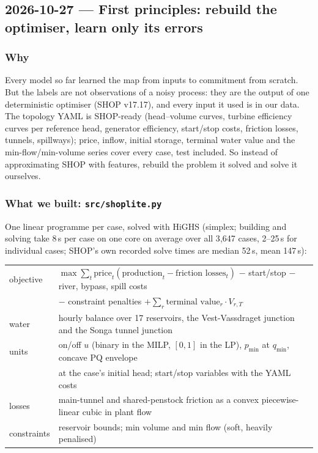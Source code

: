 \subsection{2026-10-27 --- First principles: rebuild the optimiser, learn only its errors}
\label{sec:shoplite}

\subsubsection*{Why}

Every model so far learned the map from inputs to commitment from scratch. But the labels are not
observations of a noisy process: they are the output of one deterministic optimiser (SHOP v17.17),
and every input it used is in our data. The topology YAML is SHOP-ready (head--volume curves,
turbine efficiency curves per reference head, generator efficiency, start/stop costs, friction
losses, tunnels, spillways); price, inflow, initial storage, terminal water value and the
min-flow/min-volume series cover every case, test included. So instead of approximating SHOP with
features, rebuild the problem it solved and solve it ourselves.

\subsubsection*{What we built: \texttt{src/shoplite.py}}

One linear programme per case, solved with HiGHS (simplex; building and solving take 8\,s per case
on one core on average over all 3{,}647 cases, 2--25\,s for individual cases; SHOP's own recorded
solve times are median 52\,s, mean 147\,s):

\begin{center}\small
\begin{tabular}{lp{11.5cm}}
\toprule
objective & $\max \sum_t \text{price}_t (\text{production}_t - \text{friction losses}_t)$
  $-$ start/stop $-$ river, bypass, spill costs \\
  & $-$ constraint penalties $+ \sum_r \text{terminal value}_r \cdot V_{r,T}$ \\
water & hourly balance over 17 reservoirs, the Vest-Vassdraget junction and the Songa tunnel junction \\
units & on/off $u$ (binary in the MILP, $[0,1]$ in the LP), $p_{\min}$ at $q_{\min}$, concave PQ envelope \\
      & at the case's initial head; start/stop variables with the YAML costs \\
losses & main-tunnel and shared-penstock friction as a convex piecewise-linear cubic in plant flow \\
constraints & reservoir bounds; min volume and min flow (soft, heavily penalised) \\
\bottomrule
\end{tabular}
\end{center}

